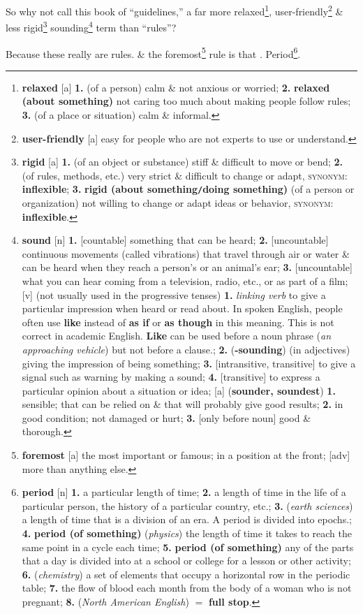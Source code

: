 \documentclass[oneside]{book}
\numberwithin{equation}{section}
\begin{document}
So why not call this book of ``guidelines,'' a far more relaxed\footnote{\textbf{relaxed} [a] \textbf{1.} (of a person) calm \& not anxious or worried; \textbf{2.} \textbf{relaxed (about something)} not caring too much about making people follow rules; \textbf{3.} (of a place or situation) calm \& informal.}, user-friendly\footnote{\textbf{user-friendly} [a] easy for people who are not experts to use or understand.} \& less rigid\footnote{\textbf{rigid} [a] \textbf{1.} (of an object or substance) stiff \& difficult to move or bend; \textbf{2.} (of rules, methods, etc.) very strict \& difficult to change or adapt, \textsc{synonym}: \textbf{inflexible}; \textbf{3.} \textbf{rigid (about something\texttt{/}doing something)} (of a person or organization) not willing to change or adapt ideas or behavior, \textsc{synonym}: \textbf{inflexible}.} sounding\footnote{\textbf{sound} [n] \textbf{1.} [countable] something that can be heard; \textbf{2.} [uncountable] continuous movements (called vibrations) that travel through air or water \& can be heard when they reach a person's or an animal's ear; \textbf{3.} [uncountable] what you can hear coming from a television, radio, etc., or as part of a film; [v] (not usually used in the progressive tenses) \textbf{1.} \textit{linking verb} to give a particular impression when heard or read about. In spoken English, people often use \textbf{like} instead of \textbf{as if} or \textbf{as though} in this meaning. This is not correct in academic English. \textbf{Like} can be used before a noun phrase (\textit{an approaching vehicle}) but not before a clause.; \textbf{2.} (\textbf{-sounding}) (in adjectives) giving the impression of being something; \textbf{3.} [intransitive, transitive] to give a signal such as warning by making a sound; \textbf{4.} [transitive] to express a particular opinion about a situation or idea; [a] (\textbf{sounder, soundest}) \textbf{1.} sensible; that can be relied on \& that will probably give good results; \textbf{2.} in good condition; not damaged or hurt; \textbf{3.} [only before noun] good \& thorough.} term than ``rules''?

Because these really are rules. \& the foremost\footnote{\textbf{foremost} [a] the most important or famous; in a position at the front; [adv] more than anything else.} rule is that . Period\footnote{\textbf{period} [n] \textbf{1.} a particular length of time; \textbf{2.} a length of time in the life of a particular person, the history of a particular country, etc.; \textbf{3.} (\textit{earth sciences}) a length of time that is a division of an era. A period is divided into epochs.; \textbf{4.} \textbf{period (of something)} (\textit{physics}) the length of time it takes to reach the same point in a cycle each time; \textbf{5.} \textbf{period (of something)} any of the parts that a day is divided into at a school or college for a lesson or other activity; \textbf{6.} (\textit{chemistry}) a set of elements that occupy a horizontal row in the periodic table; \textbf{7.} the flow of blood each month from the body of a woman who is not pregnant; \textbf{8.} (\textit{North American English}) $=$ \textbf{full stop}.}.
\end{document}
